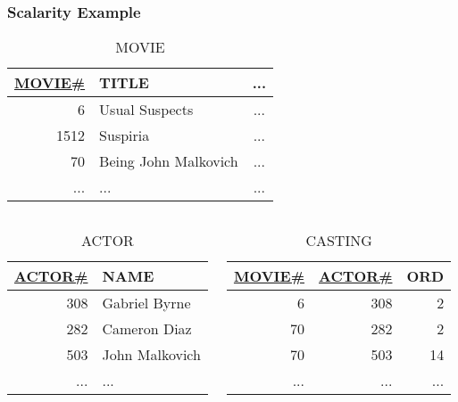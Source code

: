 \documentclass[dvipsnames]{beamer}
\theoremstyle{plain}
\begin{document}
\begin{frame}
  \frametitle{Scalarity Example}

  \begin{footnotesize}
  \begin{table}
    \caption{MOVIE}
    \begin{tabular}{|r|l|c|}\hline
\underline{MOVIE\#} & TITLE                & ...\\[2pt]\hline\hline
                  6 & Usual Suspects       & ...\\\hline
               1512 & Suspiria             & ...\\\hline
                 70 & Being John Malkovich & ...\\\hline
                ... & ...                  & ...\\\hline
    \end{tabular}
  \end{table}
  \end{footnotesize}

  \vspace{-12pt}
  \begin{columns}[t]
    \begin{footnotesize}
    \begin{table}
      \caption{ACTOR}
      \begin{tabular}{|r|l|}\hline
\underline{ACTOR\#} & NAME          \\[2pt]\hline\hline
                308 & Gabriel Byrne \\\hline
                282 & Cameron Diaz  \\\hline
                503 & John Malkovich\\\hline
                ... & ...           \\\hline
      \end{tabular}
    \end{table}
    \end{footnotesize}

    \begin{footnotesize}
    \begin{table}
      \caption{CASTING}
      \begin{tabular}{|r|r|r|}\hline
\underline{MOVIE\#} & \underline{ACTOR\#} & ORD\\[2pt]\hline\hline
                  6 &                 308 &   2\\\hline
                 70 &                 282 &   2\\\hline
                 70 &                 503 &  14\\\hline
                ... &                 ... & ...\\\hline
      \end{tabular}
    \end{table}
    \end{footnotesize}
  \end{columns}
\end{frame}
\end{document}
